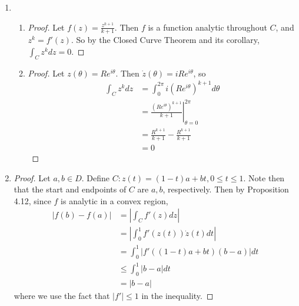 \documentclass[11pt, letterpaper]{article}
\begin{document}
\begin{enumerate}
  \newpage

  \item \begin{enumerate}
    \item \begin{proof}
      Let $f(z) = \frac{z^{k + 1}}{k + 1}$. Then $f$ is a function analytic throughout $C$, and $z^k = f'(z)$. So by the Closed Curve Theorem and its corollary, $\int_C z^k dz = 0$.
    \end{proof}

    \item \begin{proof}
      Let $z(\theta) = Re^{i\theta}$. Then $\dot z(\theta) = iRe^{i\theta}$, so
      \begin{align*}
        \int_C z^k dz
        &= \int_0^{2\pi} i(Re^{i \theta})^{k + 1} d\theta \\
        &= \left. \frac{(Re^{i\theta})^{k + 1}}{k + 1} \right\vert_{\theta = 0}^{2\pi} \\
        &= \frac{R^{k + 1}}{k + 1} - \frac{R^{k + 1}}{k + 1} \\
        &= 0
      \end{align*}
    \end{proof}
  \end{enumerate}

  \item \begin{proof}
    Let $a, b \in D$. Define $C: z(t) = (1 - t)a + bt, 0 \leq t \leq 1$. Note then that the start and endpoints of $C$ are $a, b$, respectively. Then by Proposition 4.12, since $f$ is analytic in a convex region, \begin{align*}
      \vert f(b) - f(a) \vert
      &= \left\vert \int_C f'(z) dz \right\vert \\
      &= \left\vert \int_0^1 f'(z(t)) \dot z(t) dt \right\vert \\
      &= \int_0^1 \left\vert f'((1 - t)a + bt) (b - a) \right\vert dt \\
      &\leq \int_0^1 \vert b - a \vert dt \\
      &= \vert b - a \vert
    \end{align*}
    where we use the fact that $\vert f' \vert \leq 1$ in the inequality.
  \end{proof}
\end{enumerate}
\end{document}
